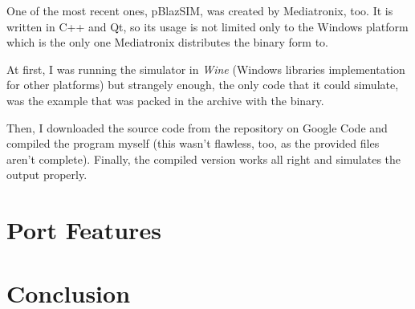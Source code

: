        One of the most recent ones, pBlazSIM, was created by Mediatronix, too. It is written in C++ and Qt, so its usage is not limited only to the Windows platform which is the only one Mediatronix distributes the binary form to.

        At first, I was running the simulator in \emph{Wine} (Windows libraries implementation for other platforms) but strangely enough, the only code that it could simulate, was the example that was packed in the archive with the binary.

        Then, I downloaded the source code from the repository on Google Code and compiled the program myself (this wasn't flawless, too, as the provided files aren't complete). Finally, the compiled version works all right and simulates the output properly.

        

\chapter{Port Features}\label{features}

\chapter{Conclusion}\label{conclusion}


\cite{TBD}
